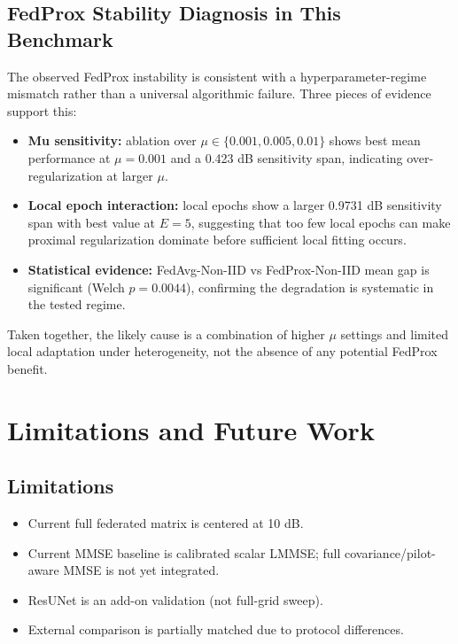 \documentclass[onecolumn]{IEEEtran}
\begin{document}
\subsection{FedProx Stability Diagnosis in This Benchmark}
The observed FedProx instability is consistent with a hyperparameter-regime mismatch rather than a universal algorithmic failure. Three pieces of evidence support this:
\begin{itemize}
    \item \textbf{Mu sensitivity:} ablation over $\mu\in\{0.001,0.005,0.01\}$ shows best mean performance at $\mu=0.001$ and a 0.423 dB sensitivity span, indicating over-regularization at larger $\mu$.
    \item \textbf{Local epoch interaction:} local epochs show a larger 0.9731 dB sensitivity span with best value at $E=5$, suggesting that too few local epochs can make proximal regularization dominate before sufficient local fitting occurs.
    \item \textbf{Statistical evidence:} FedAvg-Non-IID vs FedProx-Non-IID mean gap is significant (Welch $p=0.0044$), confirming the degradation is systematic in the tested regime.
\end{itemize}

Taken together, the likely cause is a combination of higher $\mu$ settings and limited local adaptation under heterogeneity, not the absence of any potential FedProx benefit.

\section{Limitations and Future Work}
\subsection{Limitations}
\begin{itemize}
    \item Current full federated matrix is centered at 10 dB.
    \item Current MMSE baseline is calibrated scalar LMMSE; full covariance/pilot-aware MMSE is not yet integrated.
    \item ResUNet is an add-on validation (not full-grid sweep).
    \item External comparison is partially matched due to protocol differences.
\end{itemize}
\end{document}
